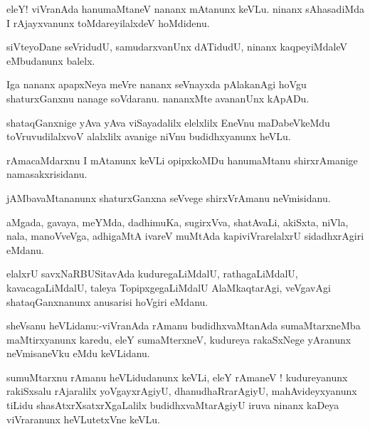 \documentclass{article}
\begin{document}
\begin{mn}%
eleY! viVranAda hanumaMtaneV nananx mAtanunx keVLu. ninanx sAhasadiMda I rAjayxvanunx 
toMdareyilalxdeV hoMdidenu.
\end{mn}

\begin{mn}%
siVteyoDane seVridudU, samudarxvanUnx dATidudU, ninanx kaqpeyiMdaleV eMbudanunx balelx.
\end{mn}

\begin{mn}%
Iga nananx apapxNeya meVre nananx seVnayxda pAlakanAgi hoVgu shaturxGanxnu nanage 
soVdaranu. nananxMte avananUnx kApADu.
\end{mn}

\begin{mn}%
shataqGanxnige yAva yAva viSayadalilx elelxlilx EneVnu maDabeVkeMdu toVruvudilalxvoV 
alalxlilx avanige niVnu budidhxyanunx heVLu.
\end{mn}

\begin{mn}%
rAmacaMdarxnu I mAtanunx keVLi opipxkoMDu hanumaMtanu shirxrAmanige namasakxrisidanu. 
\end{mn}

\begin{mn}%
jAMbavaMtananunx shaturxGanxna seVvege shirxVrAmanu neVmisidanu.
\end{mn}

\begin{mn}%
aMgada, gavaya, meYMda, dadhimuKa, sugirxVva, shatAvaLi, akiSxta, niVla, nala, manoVveVga, 
adhigaMtA ivareV muMtAda kapiviVrarelalxrU sidadhxrAgiri eMdanu.
\end{mn}

\begin{mn}%
elalxrU savxNaRBUSitavAda kuduregaLiMdalU, rathagaLiMdalU, kavacagaLiMdalU, taleya 
TopipxgegaLiMdalU AlaMkaqtarAgi, veVgavAgi shataqGanxnanunx anusarisi hoVgiri eMdanu.
\end{mn}

\begin{mn}%
sheVsanu heVLidanu:-viVranAda rAmanu budidhxvaMtanAda sumaMtarxneMba maMtirxyanunx karedu, 
eleY sumaMterxneV, kudureya rakaSxNege yAranunx neVmisaneVku eMdu keVLidanu.
\end{mn}

\begin{mn}%
sumuMtarxnu rAmanu heVLidudanunx keVLi, eleY rAmaneV ! kudureyanunx rakiSxsalu rAjaralilx 
yoVgayxrAgiyU, dhanudhaRrarAgiyU, mahAvideyxyanunx tiLidu shasAtxrXsatxrXgaLalilx 
budidhxvaMtarAgiyU iruva ninanx kaDeya viVraranunx heVLutetxVne keVLu. 
\end{mn}
\end{document}
